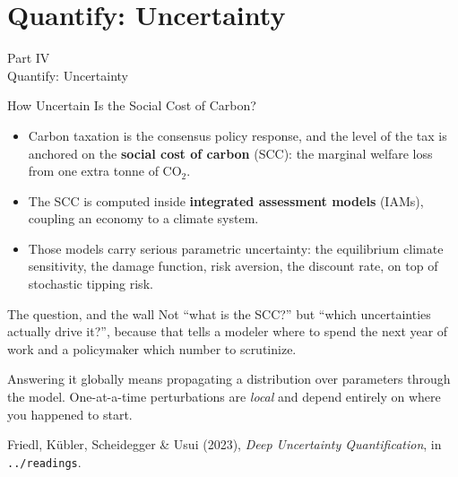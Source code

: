 \documentclass[aspectratio=169,11pt]{beamer}
\newcommand{\emphc}[1]{\textcolor{harvardcrimson}{#1}}
\begin{document}

\section{Quantify: Uncertainty}

\begin{frame}{}
\begin{center}
{\Huge \textcolor{uzhblue}{Part IV}}\\[0.8em]
{\LARGE Quantify: Uncertainty}
\end{center}
\end{frame}

\begin{frame}{How Uncertain Is the Social Cost of Carbon?}
\small
\begin{itemize}\itemsep3pt
  \item Carbon taxation is the consensus policy response, and the level of the tax is anchored on the \textbf{social cost of carbon} (SCC): the marginal welfare loss from one extra tonne of CO$_2$.
  \item The SCC is computed inside \textbf{integrated assessment models} (IAMs), coupling an economy to a climate system.
  \item Those models carry serious \emphc{parametric} uncertainty: the equilibrium climate sensitivity, the damage function, risk aversion, the discount rate, on top of stochastic tipping risk.
\end{itemize}

\vspace{0.15cm}
\begin{alertblock}{The question, and the wall}
Not ``what is the SCC?'' but \emphc{``which uncertainties actually drive it?''}, because that tells a modeler where to spend the next year of work and a policymaker which number to scrutinize.

\vspace{2pt}
Answering it globally means propagating a distribution over parameters through the model. One-at-a-time perturbations are \emph{local} and depend entirely on where you happened to start.
\end{alertblock}

\vspace{0.1cm}
{\footnotesize Friedl, K\"ubler, Scheidegger \& Usui (2023), \emph{Deep Uncertainty Quantification}, in \texttt{../readings}.}
\end{frame}
\end{document}
